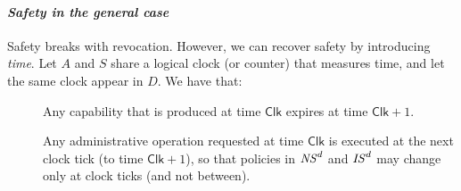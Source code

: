 \documentclass[10pt]{article}
\makeatletter
\newcounter{Crules}
\newcommand{\clk}{\mathsf{Clk}}
\newcommand{\R}{\addtocounter{Crules}{1}R\arabic{Crules}\gdef\@currentlabel{\arabic{Crules}}}
\makeatother
\begin{document}
\paragraph{\em Safety in the general case}
Safety breaks with revocation. However, we can recover
safety by introducing \emph{time}. Let $A$ and $S$ share a logical clock (or counter) that measures time, and let the same clock appear in $D$. We have that:
\begin{description}
\item[\R]\label{Rexpire} Any capability that is produced at time $\clk$ expires at time $\clk+1$.\item[\R]\label{Rdelay} Any administrative operation requested at time $\clk$ is executed at the next clock tick (to time $\clk + 1$), so that policies in ${\it NS}^d$ and ${\it IS}^d$ may change only at clock ticks (and not between).  
\end{description}
\end{document}
